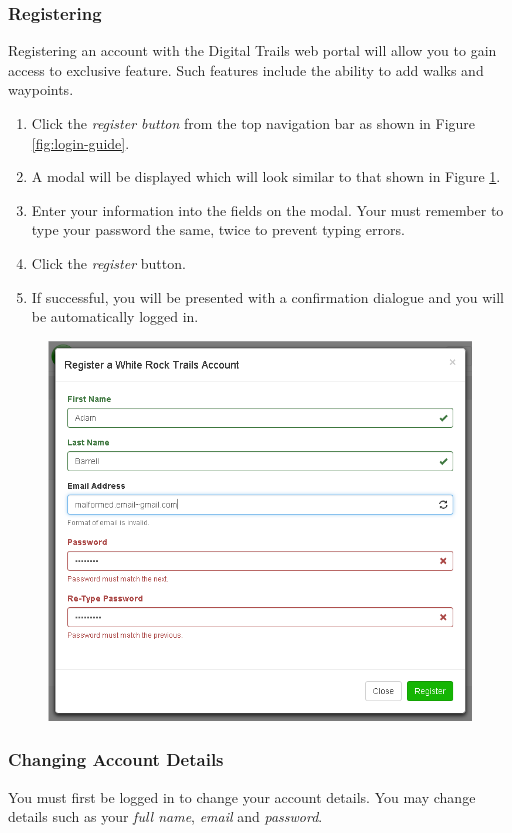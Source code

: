 \documentclass[11pt,a4paper]{report}
\begin{document}
\subsubsection{Registering}

Registering an account with the Digital Trails web portal will allow you to gain access to exclusive feature. Such features include the ability to add walks and waypoints.

\begin{enumerate}
\item Click the \emph{register button} from the top navigation bar as shown in Figure \ref{fig:login-guide}.
\item A modal will be displayed which will look similar to that shown in Figure \ref{fig:registration-guide}.
\item Enter your information into the fields on the modal. Your must remember to type your password the same, twice to prevent typing errors.
\item Click the \emph{register} button.
\item If successful, you will be presented with a confirmation dialogue and you will be automatically logged in.
\end{enumerate}

\begin{figure}[H]
\centering
\includegraphics[width=0.6\linewidth]{./img/webportal/registration}
\caption{}
\label{fig:registration-guide}
\end{figure}


\subsubsection{Changing Account Details}

You must first be logged in to change your account details. You may change details such as your \emph{full name}, \emph{email} and \emph{password}.
\end{document}
